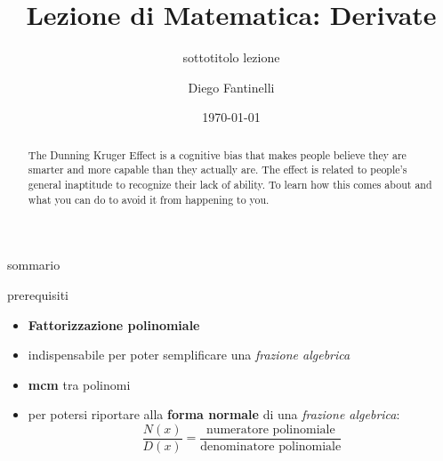 \documentclass[aspectratio=169]{beamer}
\title{Lezione di Matematica: Derivate}
\subtitle{sottotitolo lezione}
\date{\today}
\author{Diego Fantinelli}
\institute{Matematica per il Liceo}
\begin{document}

\begin{frame}
	\titlepage
\end{frame}

\begin{frame}
    
    \begin{abstract}
        The Dunning Kruger Effect is a cognitive bias that makes people believe
        they are smarter and more capable than they actually are. The effect is
        related to people's general inaptitude to recognize their lack of
        ability. To learn how this comes about and what you can do to avoid it
        from happening to you.
    \end{abstract}
\end{frame}

\begin{frame}{sommario}
  \tableofcontents
\end{frame}








\begin{frame}{prerequisiti}
\begin{itemize}
\item
  \textbf{Fattorizzazione polinomiale}
\item
  indispensabile per poter semplificare una \emph{frazione algebrica}
\item
  \textbf{mcm} tra polinomi
\item
  per potersi riportare alla \textbf{forma normale} di una
  \emph{frazione algebrica}: \[\dfrac{N(x)}{D(x)} = \dfrac{\text{numeratore polinomiale}}{\text{denominatore polinomiale}}\]
\end{itemize}
\end{frame}
\end{document}
